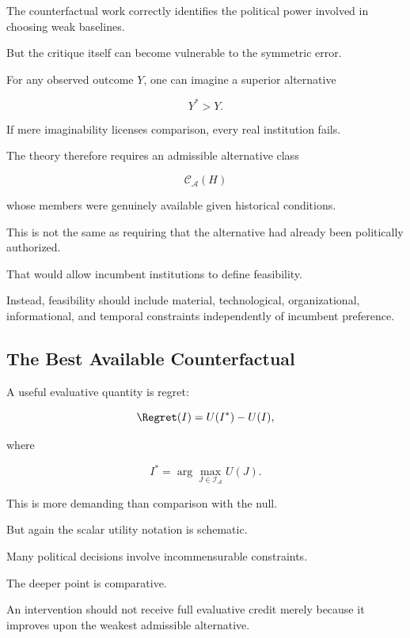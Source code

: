 \documentclass[11pt]{article}
\theoremstyle{remark}
\newcommand{\Adm}{\mathcal{A}}
\begin{document}
The counterfactual work correctly identifies the political power involved in choosing weak baselines.

But the critique itself can become vulnerable to the symmetric error.

For any observed outcome $Y$, one can imagine a superior alternative

\begin{equation}
Y^\ast>Y.
\end{equation}

If mere imaginability licenses comparison, every real institution fails.

The theory therefore requires an admissible alternative class

\begin{equation}
\mathcal{C}_{\Adm}(H)
\end{equation}

whose members were genuinely available given historical conditions.

This is not the same as requiring that the alternative had already been politically authorized.

That would allow incumbent institutions to define feasibility.

Instead, feasibility should include material, technological, organizational, informational, and temporal constraints independently of incumbent preference.

\subsection{The Best Available Counterfactual}

A useful evaluative quantity is regret:

\begin{equation}
\Regret(I)
=
U(I^\ast)-U(I),
\end{equation}

where

\begin{equation}
I^\ast
=
\arg\max_{J\in\mathcal{I}_{\Adm}}
U(J).
\end{equation}

This is more demanding than comparison with the null.

But again the scalar utility notation is schematic.

Many political decisions involve incommensurable constraints.

The deeper point is comparative.

An intervention should not receive full evaluative credit merely because it improves upon the weakest admissible alternative.
\end{document}
